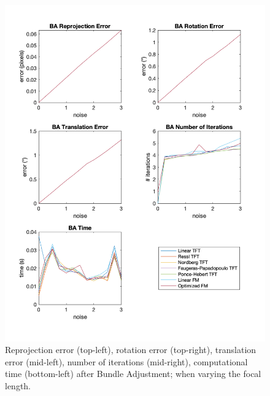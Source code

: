 \begin{figure}[p]
	\centering
	\includegraphics[width=1\textwidth]{Experiments/Synthetic/noise/BAnoisePlots.png}
	\caption{Reprojection error (top-left), rotation error (top-right), translation error (mid-left), number of iterations (mid-right), computational time (bottom-left) after Bundle Adjustment; when varying the focal length.}
	\label{fig:BANoisePlot}
\end{figure}

